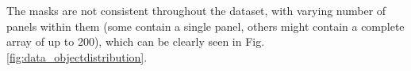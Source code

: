 \documentclass[conference]{IEEEtran}
\begin{document}

The masks are not consistent throughout the dataset, with varying number of panels within them (some contain a single panel, others might contain a complete array of up to 200), which can be clearly seen in Fig. \ref{fig:data_objectdistribution}.
\end{document}
